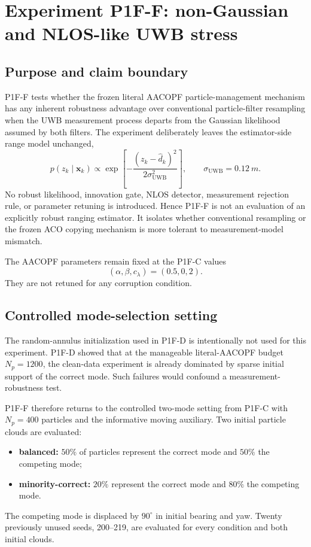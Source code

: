 \section{Experiment P1F-F: non-Gaussian and NLOS-like UWB stress}
\subsection{Purpose and claim boundary}
P1F-F tests whether the frozen literal AACOPF particle-management mechanism has any inherent robustness advantage over conventional particle-filter resampling when the UWB measurement process departs from the Gaussian likelihood assumed by both filters. The experiment deliberately leaves the estimator-side range model unchanged,
\begin{equation}
    p(z_k\mid\bm x_k)\propto
    \exp\!\left[-\frac{(z_k-\hat d_k)^2}{2\sigma_{\mathrm{UWB}}^2}\right],
    \qquad \sigma_{\mathrm{UWB}}=\SI{0.12}{m}.
\end{equation}
No robust likelihood, innovation gate, NLOS detector, measurement rejection rule, or parameter retuning is introduced. Hence P1F-F is not an evaluation of an explicitly robust ranging estimator. It isolates whether conventional resampling or the frozen ACO copying mechanism is more tolerant to measurement-model mismatch.

The AACOPF parameters remain fixed at the P1F-C values
\begin{equation}
    (\alpha,\beta,c_\lambda)=(0.5,0,2).
\end{equation}
They are not retuned for any corruption condition.

\subsection{Controlled mode-selection setting}
The random-annulus initialization used in P1F-D is intentionally not used for this experiment. P1F-D showed that at the manageable literal-AACOPF budget $N_p=1200$, the clean-data experiment is already dominated by sparse initial support of the correct mode. Such failures would confound a measurement-robustness test.

P1F-F therefore returns to the controlled two-mode setting from P1F-C with $N_p=400$ particles and the informative moving auxiliary. Two initial particle clouds are evaluated:
\begin{itemize}
    \item \textbf{balanced:} $50\%$ of particles represent the correct mode and $50\%$ the competing mode;
    \item \textbf{minority-correct:} $20\%$ represent the correct mode and $80\%$ the competing mode.
\end{itemize}
The competing mode is displaced by $90^\circ$ in initial bearing and yaw. Twenty previously unused seeds, 200--219, are evaluated for every condition and both initial clouds.

